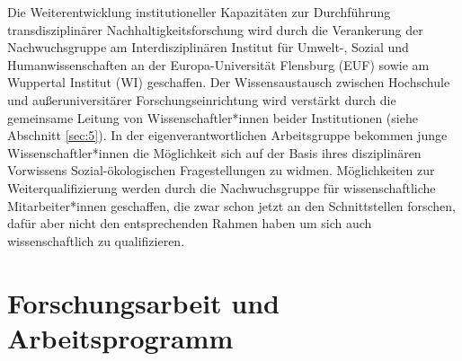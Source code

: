 \documentclass[a4paper,11pt,twoside]{scrartcl}
\begin{document}
Die Weiterentwicklung institutioneller Kapazitäten zur Durchführung transdisziplinärer Nachhaltigkeitsforschung wird durch die Verankerung der Nachwuchsgruppe am Interdisziplinären Institut für Umwelt-, Sozial und Humanwissenschaften an der Europa-Universität Flensburg (EUF) sowie am Wuppertal Institut (WI) geschaffen. Der Wissensaustausch zwischen Hochschule und außeruniversitärer Forschungseinrichtung wird verstärkt durch die gemeinsame Leitung von Wissenschaftler*innen beider Institutionen (siehe Abschnitt \ref{sec:5}). In der eigenverantwortlichen Arbeitsgruppe bekommen junge Wissenschaftler*innen die Möglichkeit sich auf der Basis ihres disziplinären Vorwissens Sozial-ökologischen Fragestellungen zu widmen. Möglichkeiten zur Weiterqualifizierung werden durch die Nachwuchsgruppe für wissenschaftliche Mitarbeiter*innen geschaffen, die zwar schon jetzt an den Schnittstellen forschen, dafür aber nicht den entsprechenden Rahmen haben um sich auch wissenschaftlich zu qualifizieren.

\section{Forschungsarbeit und Arbeitsprogramm}
\label{sec:4}
\end{document}
